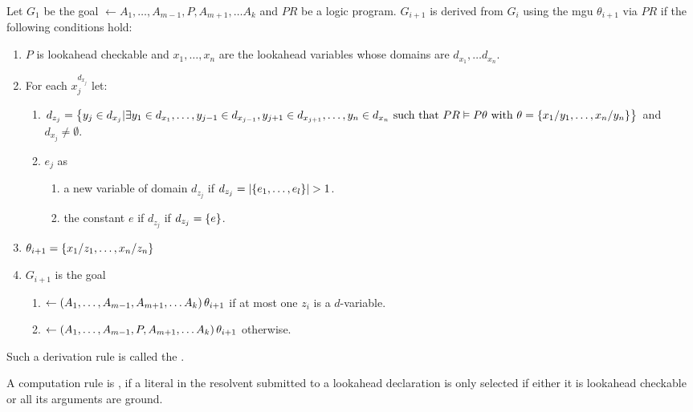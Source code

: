 \begin{defi}
Let $G_1$ be the goal $\leftarrow A_1,\ldots,A_{m-1},P,A_{m+1},\ldots A_k$ and $PR$ be a logic program. $G_{i+1}$ is derived from $G_i$ using the mgu $\theta_{i+1}$ via $PR$ if the following conditions hold:
\begin{enumerate}
 \item $P$ is lookahead checkable and $x_1,\ldots,x_n$ are the lookahead variables whose domains are $d_{x_1},\ldots d_{x_n}$.
 \item For each $x_j^{d_{x_j}}$ let:
 \begin{enumerate}
  \item $d_{z_j}=\left\{ y_j\in d_{x_j}|\exists y_1\in d_{x_1},\ldots,y_{j-1}\in d_{x_{j-1}},y_{j+1}\in d_{x_{j+1}},\ldots,y_n\in d_{x_n}\mbox{ such that }PR\vDash P\theta\mbox{ with }\theta=\left\{ x_1/y_1,\ldots,x_n/y_n\right\}\right\}$ and $d_{x_j}\neq\emptyset$.
  \item $e_j$ as
  \begin{enumerate}
   \item a new variable of domain $d_{z_j}$ if $d_{z_j}=\abs{\accol{e_1,\ldots,e_l}}>1$.
   \item the constant $e$ if $d_{z_j}$ if $d_{z_j}=\left\{ e\right\}$.
  \end{enumerate}
 \end{enumerate}
 \item $\theta_{i+1}=\left\{ x_1/z_1,\ldots,x_n/z_n\right\}$
 \item $G_{i+1}$ is the goal
 \begin{enumerate}
  \item $\leftarrow\left( A_1,\ldots,A_{m-1},A_{m+1},\ldots A_k\right)\theta_{i+1}$ if at most one $z_i$ is a $d$-variable.
  \item $\leftarrow\left( A_1,\ldots,A_{m-1},P,A_{m+1},\ldots A_k\right)\theta_{i+1}$ otherwise.
 \end{enumerate}
\end{enumerate}
Such a derivation rule is called the .
\cite{conf/ijcai/Hentenryck87}
\end{defi}

\begin{defi}
A computation rule is , if a literal in the resolvent submitted to a lookahead declaration is only selected if either it is lookahead checkable or all its arguments are ground.
\cite{conf/ijcai/Hentenryck87}
\end{defi}

